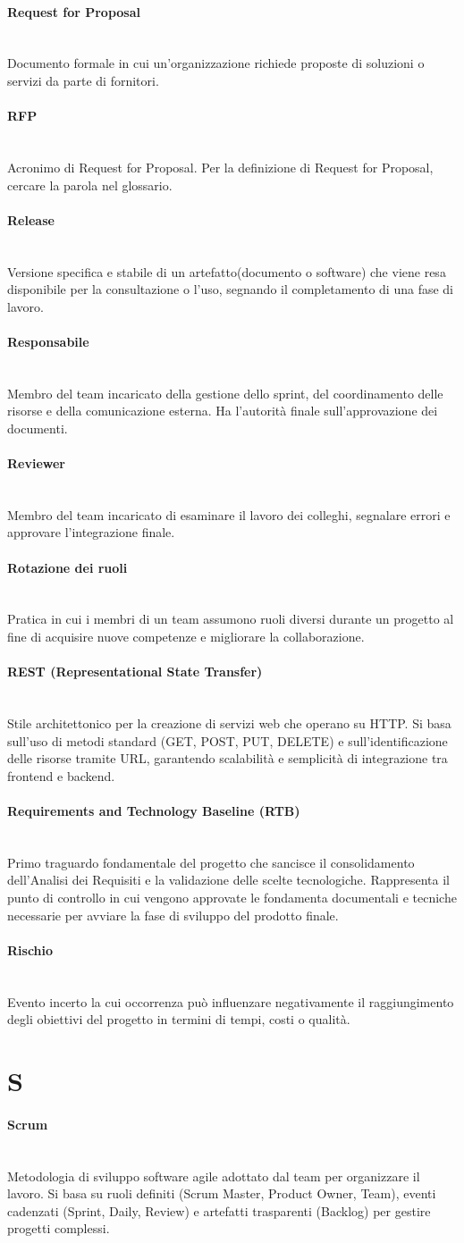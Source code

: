 \documentclass[a4paper, 10pt, colorlinks=true, linkcolor=black, urlcolor=blue, citecolor=blue, hidelinks]{article}
\newcommand{\glossaryterm}[2]{
    \paragraph{#1 \label{term:#1}} \mbox{} \\
    #2
    \vspace{0.5em}
}
\begin{document}
\glossaryterm{Request for Proposal}{Documento formale in cui un'organizzazione richiede proposte di soluzioni o servizi da parte di fornitori.}

\glossaryterm{RFP}{Acronimo di Request for Proposal. Per la definizione di Request for Proposal, cercare la parola nel glossario.}

\glossaryterm{Release}{Versione specifica e stabile di un artefatto(documento o software) che viene resa disponibile per la consultazione o l'uso, segnando il completamento di una fase di lavoro.}

\glossaryterm{Responsabile}{Membro del team incaricato della gestione dello sprint, del coordinamento delle risorse e della comunicazione esterna. Ha l'autorità finale sull'approvazione dei documenti.}

\glossaryterm{Reviewer}{Membro del team incaricato di esaminare il lavoro dei colleghi, segnalare errori e approvare l'integrazione finale.}

\glossaryterm{Rotazione dei ruoli}{Pratica in cui i membri di un team assumono ruoli diversi durante un progetto al fine di acquisire nuove competenze e migliorare la collaborazione.}

\glossaryterm{REST (Representational State Transfer)}{Stile architettonico per la creazione di servizi web che operano su HTTP. Si basa sull'uso di metodi standard (GET, POST, PUT, DELETE) e sull'identificazione delle risorse tramite URL, garantendo scalabilità e semplicità di integrazione tra frontend e backend.}

\glossaryterm{Requirements and Technology Baseline (RTB)}{Primo traguardo fondamentale del progetto che sancisce il consolidamento dell'Analisi dei Requisiti e la validazione delle scelte tecnologiche. Rappresenta il punto di controllo in cui vengono approvate le fondamenta documentali e tecniche necessarie per avviare la fase di sviluppo del prodotto finale.}

\glossaryterm{Rischio}{Evento incerto la cui occorrenza può influenzare negativamente il raggiungimento degli obiettivi del progetto in termini di tempi, costi o qualità.}

\newpage

\section*{S}

\glossaryterm{Scrum}{Metodologia di sviluppo software agile adottato dal team per organizzare il lavoro. Si basa su ruoli definiti (Scrum Master, Product Owner, Team), eventi cadenzati (Sprint, Daily, Review) e artefatti trasparenti (Backlog) per gestire progetti complessi.}
\end{document}
